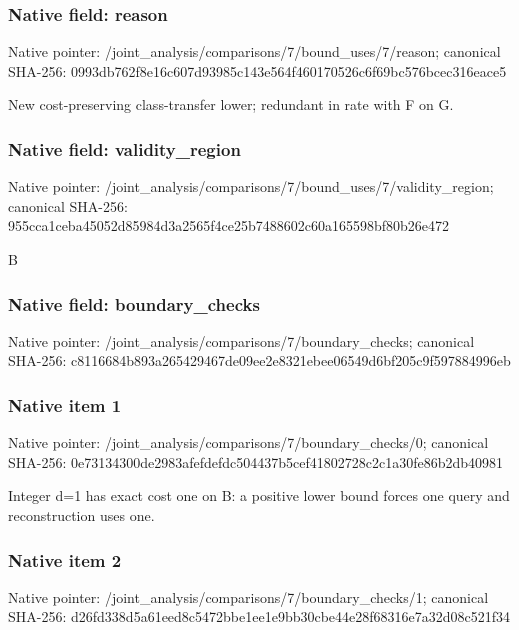 \documentclass[10pt,a4paper]{article}
\begin{document}
\subsubsection{Native field: reason}
Native pointer: /joint\_\allowbreak{}analysis/comparisons/7/bound\_\allowbreak{}uses/7/reason; canonical SHA-256: 0993db762f8e16c607d93985c143e564f460170526c6f69bc576bcec316eace5

\begingroup\raggedright\sloppy New cost-preserving class-transfer lower;\allowbreak{} redundant in rate with F on G.\par\endgroup

\subsubsection{Native field: validity\_\allowbreak{}region}
Native pointer: /joint\_\allowbreak{}analysis/comparisons/7/bound\_\allowbreak{}uses/7/validity\_\allowbreak{}region; canonical SHA-256: 955cca1ceba45052d85984d3a2565f4ce25b7488602c60a165598bf80b26e472

\begingroup\raggedright\sloppy B\par\endgroup

\subsubsection{Native field: boundary\_\allowbreak{}checks}
Native pointer: /joint\_\allowbreak{}analysis/comparisons/7/boundary\_\allowbreak{}checks; canonical SHA-256: c8116684b893a265429467de09ee2e8321ebee06549d6bf205c9f597884996eb

\subsubsection{Native item 1}
Native pointer: /joint\_\allowbreak{}analysis/comparisons/7/boundary\_\allowbreak{}checks/0; canonical SHA-256: 0e73134300de2983afefdefdc504437b5cef41802728c2c1a30fe86b2db40981

\begingroup\raggedright\sloppy Integer d=\allowbreak{}1 has exact cost one on B:\allowbreak{} a positive lower bound forces one query and reconstruction uses one.\par\endgroup

\subsubsection{Native item 2}
Native pointer: /joint\_\allowbreak{}analysis/comparisons/7/boundary\_\allowbreak{}checks/1; canonical SHA-256: d26fd338d5a61eed8c5472bbe1ee1e9bb30cbe44e28f68316e7a32d08c521f34
\end{document}
